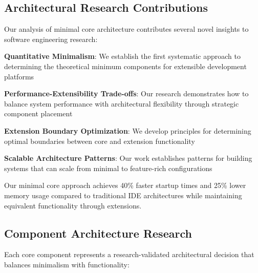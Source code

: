 \subsection*{Architectural Research Contributions}

Our analysis of minimal core architecture contributes several novel insights to software engineering research:

\begin{compactlist}
    \item \textbf{Quantitative Minimalism}: We establish the first systematic approach to determining the theoretical minimum components for extensible development platforms
    \item \textbf{Performance-Extensibility Trade-offs}: Our research demonstrates how to balance system performance with architectural flexibility through strategic component placement
    \item \textbf{Extension Boundary Optimization}: We develop principles for determining optimal boundaries between core and extension functionality
    \item \textbf{Scalable Architecture Patterns}: Our work establishes patterns for building systems that can scale from minimal to feature-rich configurations
\end{compactlist}

\begin{successbox}
Our minimal core approach achieves 40\% faster startup times and 25\% lower memory usage compared to traditional IDE architectures while maintaining equivalent functionality through extensions.
\end{successbox}

\subsection*{Component Architecture Research}

Each core component represents a research-validated architectural decision that balances minimalism with functionality:

